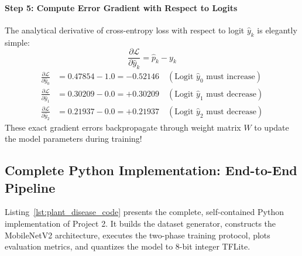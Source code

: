 \begin{example}
\paragraph{Step 5: Compute Error Gradient with Respect to Logits}
The analytical derivative of cross-entropy loss with respect to logit $\hat{y}_k$ is elegantly simple:
\begin{equation}
\frac{\partial \mathcal{L}}{\partial \hat{y}_k} = \hat{p}_k - y_k
\end{equation}
\begin{align*}
\frac{\partial \mathcal{L}}{\partial \hat{y}_0} &= 0.47854 - 1.0 = \mathbf{-0.52146} \quad (\text{Logit }\hat{y}_0\text{ must increase}) \\
\frac{\partial \mathcal{L}}{\partial \hat{y}_1} &= 0.30209 - 0.0 = \mathbf{+0.30209} \quad (\text{Logit }\hat{y}_1\text{ must decrease}) \\
\frac{\partial \mathcal{L}}{\partial \hat{y}_2} &= 0.21937 - 0.0 = \mathbf{+0.21937} \quad (\text{Logit }\hat{y}_2\text{ must decrease})
\end{align*}
These exact gradient errors backpropagate through weight matrix $W$ to update the model parameters during training!
\end{example}

\subsection{Complete Python Implementation: End-to-End Pipeline}\label{subsec:p2_code}

Listing~\ref{lst:plant_disease_code} presents the complete, self-contained Python implementation of Project 2. It builds the dataset generator, constructs the MobileNetV2 architecture, executes the two-phase training protocol, plots evaluation metrics, and quantizes the model to 8-bit integer TFLite.

